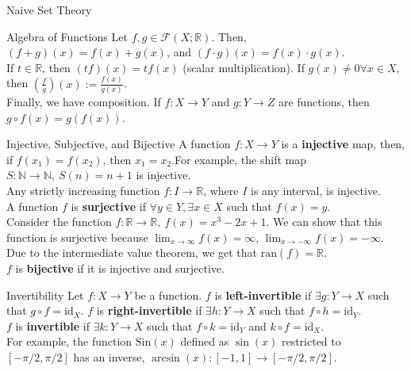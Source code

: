 \documentclass[10pt]{extarticle}
\begin{document}
\begin{problem}{Naive Set Theory}
\begin{problem}{Algebra of Functions}
      Let $f,g\in \mathcal{F}(X;\mathbb{R})$. Then, $(f+g)(x) = f(x) + g(x)$, and $(f\cdot g)(x) = f(x)\cdot g(x)$.\\

      If $t\in \mathbb{R}$, then $(tf)(x) = tf(x)$ (scalar multiplication). If $g(x)\neq 0\forall x\in X$, then $\left(\frac{f}{g}\right)(x) := \frac{f(x)}{g(x)}$.\\

      Finally, we have composition. If $f:X\rightarrow Y$ and $g:Y\rightarrow Z$ are functions, then $g\circ f(x) = g(f(x))$.
    \end{problem}
    \begin{problem}{Injective, Subjective, and Bijective}
      A function $f:X\rightarrow Y$ is a \textbf{injective} map, then, if $f(x_1) = f(x_2)$, then $x_1 = x_2$.For example, the shift map $S:\mathbb{N} \rightarrow \mathbb{N},~S(n) = n+1$ is injective.\\

      Any strictly increasing function $f:I\rightarrow \mathbb{R}$, where $I$ is any interval, is injective.\\

      A function $f$ is \textbf{surjective} if $\forall y\in Y, \exists x\in X$ such that $f(x) = y$.\\

      Consider the function $f:\mathbb{R} \rightarrow \mathbb{R},~f(x) = x^3-2x+1$. We can show that this function is surjective because $\lim_{x\rightarrow \infty}f(x) = \infty$, $\lim_{x\rightarrow -\infty} f(x) = -\infty$. Due to the intermediate value theorem, we get that $\text{ran}(f) = \mathbb{R}$.\\

      $f$ is \textbf{bijective} if it is injective and surjective.
    \end{problem}
    \begin{problem}{Invertibility}
      Let $f:X\rightarrow Y$ be a function. $f$ is \textbf{left-invertible} if $\exists g:Y\rightarrow X$ such that $g\circ f = \text{id}_X$. $f$ is \textbf{right-invertible} if $\exists h:Y\rightarrow X$ such that $f\circ h = \text{id}_Y$.\\

      $f$ is \textbf{invertible} if $\exists k:Y\rightarrow X$ such that $f\circ k = \text{id}_Y$ and $k\circ f = \text{id}_X$.\\

      For example, the function $\text{Sin}(x)$ defined as $\sin(x)$ restricted to $[-\pi/2,\pi/2]$ has an inverse, $\arcsin(x):[-1,1] \rightarrow [-\pi/2,\pi/2]$.
    \end{problem}
  \end{problem}
\end{document}
